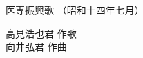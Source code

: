 \documentclass[10pt,b5j]{tarticle} %
\begin{document}
\begin{minipage}[c]{0.7\hsize} %
    \begin{center}
        {\LARGE
            医専振興歌 %
        }
        {\small 
            （昭和十四年七月） %
        }
    \end{center}
\end{minipage}
\begin{minipage}[c]{0.3\hsize} %
    \begin{flushright} %
        高見浩也君 作歌\\向井弘君 作曲 %
    \end{flushright}
\end{minipage}
\end{document}
